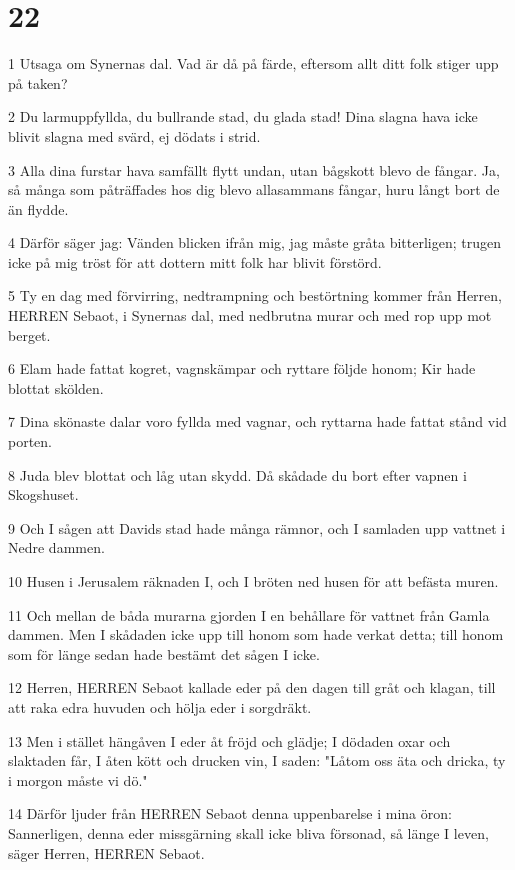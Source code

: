 \chapter{22}

\par 1 Utsaga om Synernas dal. Vad är då på färde, eftersom allt ditt folk stiger upp på taken?
\par 2 Du larmuppfyllda, du bullrande stad, du glada stad! Dina slagna hava icke blivit slagna med svärd, ej dödats i strid.
\par 3 Alla dina furstar hava samfällt flytt undan, utan bågskott blevo de fångar. Ja, så många som påträffades hos dig blevo allasammans fångar, huru långt bort de än flydde.
\par 4 Därför säger jag: Vänden blicken ifrån mig, jag måste gråta bitterligen; trugen icke på mig tröst för att dottern mitt folk har blivit förstörd.
\par 5 Ty en dag med förvirring, nedtrampning och bestörtning kommer från Herren, HERREN Sebaot, i Synernas dal, med nedbrutna murar och med rop upp mot berget.
\par 6 Elam hade fattat kogret, vagnskämpar och ryttare följde honom; Kir hade blottat skölden.
\par 7 Dina skönaste dalar voro fyllda med vagnar, och ryttarna hade fattat stånd vid porten.
\par 8 Juda blev blottat och låg utan skydd. Då skådade du bort efter vapnen i Skogshuset.
\par 9 Och I sågen att Davids stad hade många rämnor, och I samladen upp vattnet i Nedre dammen.
\par 10 Husen i Jerusalem räknaden I, och I bröten ned husen för att befästa muren.
\par 11 Och mellan de båda murarna gjorden I en behållare för vattnet från Gamla dammen. Men I skådaden icke upp till honom som hade verkat detta; till honom som för länge sedan hade bestämt det sågen I icke.
\par 12 Herren, HERREN Sebaot kallade eder på den dagen till gråt och klagan, till att raka edra huvuden och hölja eder i sorgdräkt.
\par 13 Men i stället hängåven I eder åt fröjd och glädje; I dödaden oxar och slaktaden får, I åten kött och drucken vin, I saden: "Låtom oss äta och dricka, ty i morgon måste vi dö."
\par 14 Därför ljuder från HERREN Sebaot denna uppenbarelse i mina öron: Sannerligen, denna eder missgärning skall icke bliva försonad, så länge I leven, säger Herren, HERREN Sebaot.
